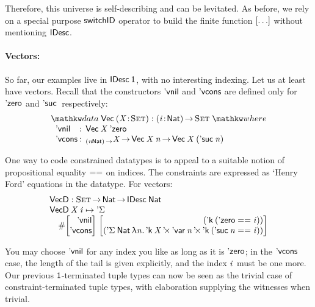 Therefore, this universe is self-describing and can be
levitated. As before, we rely on a special purpose $\F{switchID}$
operator to build the finite function $\bigRedBracket{\ldots}$
without mentioning \(\SYMBIDesc\).

\paragraph{Vectors:}

\newcommand{\VecD}{\F{VecD}}
\newcommand{\VecNil}{\etag{\CN{vnil}}}
\newcommand{\SYMBVecCons}{\etag{\CN{vcons}}\xspace}
\newcommand{\VecCons}[2]{\SYMBVecCons\:#1\:#2}

So far, our examples live in $\IDesc{\Unit}$, with no interesting
indexing. Let us at least have vectors. Recall
that the constructors $\VecNil$ and $\SYMBVecCons$ are defined only for
$\NatZero$ and $\NatSuc$ respectively:
%
\[
\stk{
\data \D{Vec}\: \PITEL{\V{X}}{\Set} : \PI{\V{i}}{\Nat} \Set \where \\
\;\;\begin{array}{@{}l@{\::\:\:}l@{\quad}l}
    \VecNil          & \D{Vec}\:\V{X}\:{\NatZero}   \\
    \SYMBVecCons & _{\PI{\V{n}}{\Nat}}\V{X} \To \D{Vec}\:{\V{X}}\:{\V{n}} \To \D{Vec}\:{\V{X}}\:{(\NatSuc{\V{n}})}
\end{array}
}
\]

One way to code constrained datatypes is to appeal to a suitable
notion of propositional equality \(\PropEq\) on indices. The
constraints are expressed as `Henry Ford' equations in the datatype.
For vectors:
%
\[\stk{
\VecD : \Set \To \Nat \To \IDesc{\Nat} \\
\VecD\: \V{X}\: \V{i} \mapsto \SYMBDSigma\\
\quad
\EnumT{\vtup{r}{\VecNil\\ \SYMBVecCons}}
\; \vtup{r}{
                            (\DConst{(\NatZero\PropEq\V{i})}) \\
 ( \DSigma{\Nat}{\LAM{\V{n}}
   \DProd{\DConst{\V{X}}}
     {\DProd{\DVar{\V{n}}}{\DConst{(\NatSuc{\V{n}}\PropEq\V{i})}})}}
                          }
}\]

You may choose $\VecNil$ for any index you like as long as it is
$\NatZero$; in the $\SYMBVecCons$ case, the length of the tail is
given explicitly, and the index $\V{i}$ must be one more. Our previous
\(\Unit\)-terminated tuple types can now be seen as the trivial case
of constraint-terminated tuple types, with elaboration supplying the
witnesses when trivial.

